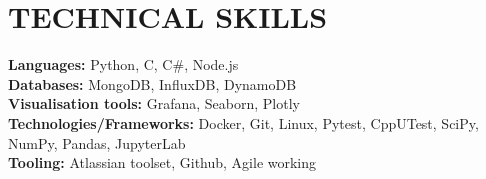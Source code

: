 \documentclass[letterpaper,11pt]{article}
\begin{document}
\section{TECHNICAL SKILLS}
 \begin{itemize}[leftmargin=0.15in, label={}]
    \small{\item{
     \textbf{\normalsize{Languages:}}{ \normalsize{Python, C, C#, Node.js}} \\
     \textbf{\normalsize{Databases:}}{\normalsize{ MongoDB, InfluxDB, DynamoDB}} \\
     \textbf{\normalsize{Visualisation tools:}}{\normalsize{ Grafana, Seaborn, Plotly }} \\
     \textbf{\normalsize{Technologies/Frameworks:}}{\normalsize{ Docker, Git, Linux, Pytest, CppUTest, SciPy, NumPy, Pandas, JupyterLab }} \\
     \textbf{\normalsize{Tooling:}}{\normalsize{ Atlassian toolset, Github, Agile working}} \\
    }}
 \end{itemize}
 \vspace{-15pt}

\end{document}
